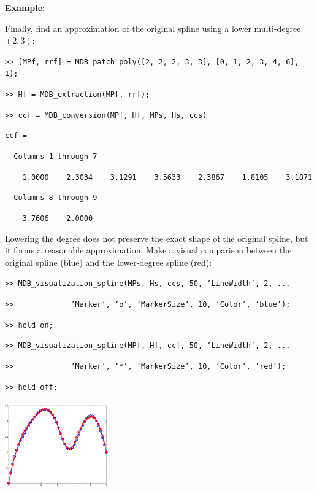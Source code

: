 \documentclass[10pt]{./acmtrans2e}
\newenvironment{example}
{\vspace*{0.1cm}
\noindent \textbf{Example:} \vspace*{0.15cm}

\setlength{\parskip}{0.5ex plus 0.5exminus 0.2 ex}
}
{\medskip
}
\begin{document}
\begin{example}
\medskip
\noindent Finally, find an approximation of the original spline using a lower multi-degree $(2,3)$:
\medskip

\texttt{>> [MPf, rrf] = MDB\_patch\_poly([2, 2, 2, 3, 3], [0, 1, 2, 3, 4, 6], 1);}

\texttt{>> Hf = MDB\_extraction(MPf, rrf);}

\texttt{>> ccf = MDB\_conversion(MPf, Hf, MPs, Hs, ccs)}

\texttt{ccf =}

\texttt{\ \ Columns 1 through 7}

\texttt{\ \ \ \ 1.0000\ \ \ \ 2.3034\ \ \ \ 3.1291\ \ \ \ 3.5633\ \ \ \ 2.3867\ \ \ \ 1.8105\ \ \ \ 3.1871}

\texttt{\ \ Columns 8 through 9}

\texttt{\ \ \ \ 3.7606\ \ \ \ 2.0000}
    
\medskip
\noindent Lowering the degree does not preserve the exact shape of the original spline, but it forms a reasonable approximation. Make a visual comparison between the original spline (blue) and the lower-degree spline (red):
\medskip

\texttt{>> MDB\_visualization\_spline(MPs, Hs, ccs, 50, 'LineWidth', 2, ...}

\texttt{>>\ \ \ \ \ \ \ \ \ \ \ \ \ 'Marker', 'o', 'MarkerSize', 10, 'Color', 'blue');}

\texttt{>> hold on;}

\texttt{>> MDB\_visualization\_spline(MPf, Hf, ccf, 50, 'LineWidth', 2, ...}

\texttt{>>\ \ \ \ \ \ \ \ \ \ \ \ \ 'Marker', '*', 'MarkerSize', 10, 'Color', 'red');}

\texttt{>> hold off;}

\begin{center}
  \includegraphics[width=4.5cm]{manual_ex_mdbspline2}
\end{center}
\end{example}
\end{document}
